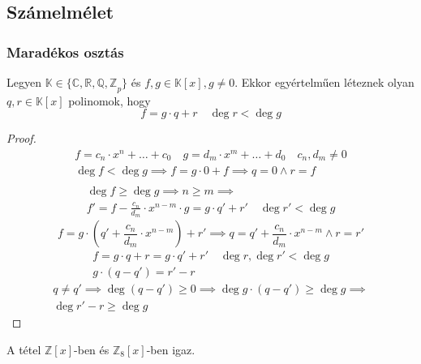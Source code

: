 \setcounter{definition}{0}
\setcounter{theorem}{0}
\subsection{Számelmélet}
\subsubsection{Maradékos osztás}
\begin{theorem}
	Legyen $\mathbb{K} \in \{ \mathbb{C, R, Q, Z}_p \}$ és
	$f, g \in \mathbb{K}[x], g \neq 0$.
	Ekkor egyértelműen léteznek olyan $q, r \in \mathbb{K}[x]$ polinomok, hogy
	\begin{equation*}
		f = g \cdot q + r \quad \deg r < \deg g
	\end{equation*}
\end{theorem}
\begin{proof}
	\begin{gather*}
		f = c_n \cdot x^n + \dots + c_0 \quad
		g = d_m \cdot x^m + \dots + d_0 \quad c_n, d_m \neq 0 \\
		\deg f < \deg g \implies f = g \cdot 0 + f \implies q = 0 \land r = f \\
	\end{gather*}
	\begin{multline*}
		\deg f \geq \deg g \implies n \geq m \implies \\
		f' = f - \frac{c_n}{d_m} \cdot x^{n - m} \cdot g = g \cdot q' + r' \quad
		\deg r' < \deg g
	\end{multline*}
	\begin{equation*}
		f = g \cdot
		\left( q' + \frac{c_n}{d_m} \cdot x^{n - m} \right) + r' \implies
		q = q' + \frac{c_n}{d_m} \cdot x^{n - m} \land r = r'
	\end{equation*}
	\begin{gather*}
		f = g \cdot q + r = g \cdot q' + r' \quad \deg r, \deg r' < \deg g \\
		g \cdot (q - q') = r' - r
	\end{gather*}
	\begin{multline*}
		q \neq q' \implies \deg(q - q') \geq 0 \implies
		\deg g \cdot (q - q') \geq \deg g \implies \\
		\deg r' - r \geq \deg g
		\tag{Ellentmondás, mert $\deg r, \deg r' < \deg g$}
	\end{multline*}
\end{proof}
\begin{remark*}
	A tétel $\mathbb{Z}[x]$-ben és $\mathbb{Z}_8[x]$-ben igaz.
\end{remark*}
